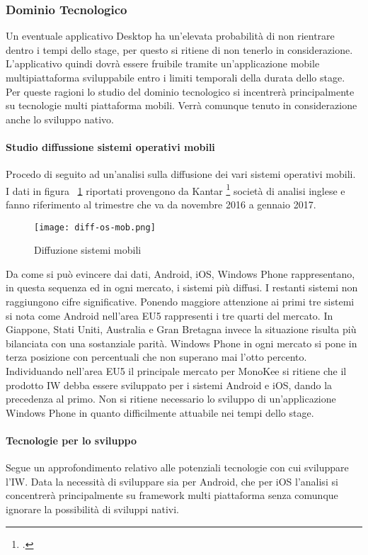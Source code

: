 \subsubsection{Dominio Tecnologico}
Un eventuale applicativo Desktop ha un’elevata probabilità di non rientrare dentro i tempi dello stage, per questo si ritiene di non tenerlo in considerazione. L’applicativo quindi dovrà essere fruibile tramite un’applicazione mobile multipiattaforma sviluppabile entro i limiti temporali della durata dello stage. 
Per queste ragioni lo studio del dominio tecnologico si incentrerà principalmente su tecnologie multi piattaforma mobili. Verrà comunque tenuto in considerazione anche lo sviluppo nativo.
\paragraph{Studio diffussione sistemi operativi mobili}
Procedo di seguito ad un’analisi sulla diffusione dei vari sistemi operativi mobili.
I dati in figura ~\ref{fig:diff-os-mob} riportati provengono da Kantar \footcite{site:kantar-study} società di analisi inglese e fanno riferimento al trimestre che va da novembre 2016 a gennaio 2017.
\begin{figure}[!h] 
    \centering
    \texttt{[image: diff-os-mob.png]} 
    \caption{Diffuzione sistemi mobili}
    \label{fig:diff-os-mob} 
\end{figure}
Da come si può evincere dai dati, Android, iOS, Windows Phone rappresentano, in questa sequenza ed in ogni mercato, i sistemi più diffusi. I restanti sistemi non raggiungono cifre significative. Ponendo maggiore attenzione ai primi tre sistemi si nota come Android nell’area EU5 rappresenti i tre quarti del mercato. In Giappone, Stati Uniti, Australia e Gran Bretagna invece la situazione risulta più bilanciata con una sostanziale parità. Windows Phone in ogni mercato si pone in terza posizione con percentuali che non superano mai l’otto percento. Individuando nell’area EU5 il principale mercato per MonoKee si ritiene che il prodotto IW debba essere sviluppato per i sistemi Android e iOS, dando la precedenza al primo. Non si ritiene necessario lo sviluppo di un’applicazione Windows Phone in quanto difficilmente attuabile nei tempi dello stage. 
\paragraph{Tecnologie per lo sviluppo}
Segue un approfondimento relativo alle potenziali tecnologie con cui sviluppare l’IW. Data la necessità di sviluppare sia per Android, che per iOS l’analisi si concentrerà principalmente su framework multi piattaforma senza comunque ignorare la possibilità di sviluppi nativi.

